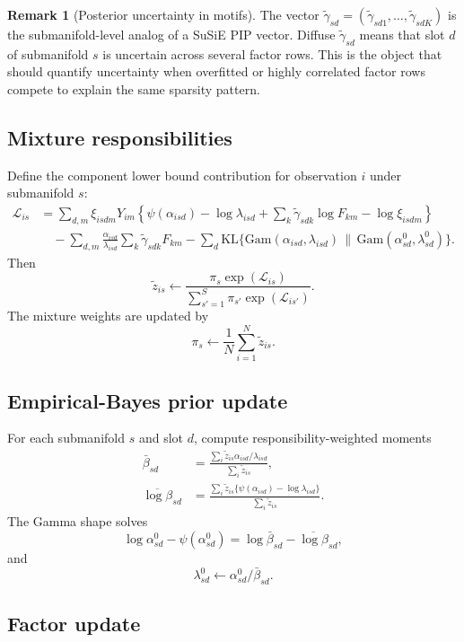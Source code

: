 \documentclass[11pt]{article}
\newcommand{\Gam}{\mathrm{Gam}}
\newcommand{\KL}{\mathrm{KL}}
\newcommand{\tg}{\widetilde{\gamma}}
\newcommand{\tz}{\widetilde{z}}
\theoremstyle{definition}
\newtheorem{remark}{Remark}
\begin{document}
\begin{remark}[Posterior uncertainty in motifs]
The vector $\tg_{sd}=(\tg_{sd1},\ldots,\tg_{sdK})$ is the submanifold-level
analog of a SuSiE PIP vector. Diffuse $\tg_{sd}$ means that slot $d$ of
submanifold $s$ is uncertain across several factor rows. This is the object that
should quantify uncertainty when overfitted or highly correlated factor rows
compete to explain the same sparsity pattern.
\end{remark}

\subsection{Mixture responsibilities}

Define the component lower bound contribution for observation $i$ under
submanifold $s$:
\begin{align}
  \mathcal{L}_{is}
  &=
  \sum_{d,m}
  \xi_{isdm}Y_{im}
  \left\{
    \psi(\alpha_{isd})-\log\lambda_{isd}
    +
    \sum_k\tg_{sdk}\log F_{km}
    -
    \log \xi_{isdm}
  \right\} \nonumber \\
  &\quad
  -
  \sum_{d,m}
  \frac{\alpha_{isd}}{\lambda_{isd}}
  \sum_k\tg_{sdk}F_{km}
  -
  \sum_d
  \KL\{\Gam(\alpha_{isd},\lambda_{isd})
        \,\|\,\Gam(\alpha^0_{sd},\lambda^0_{sd})\}.
\end{align}
Then
\[
  \tz_{is}
  \leftarrow
  \frac{\pi_s\exp(\mathcal{L}_{is})}
       {\sum_{s'=1}^{S}\pi_{s'}\exp(\mathcal{L}_{is'})}.
\]
The mixture weights are updated by
\[
  \pi_s \leftarrow \frac{1}{N}\sum_{i=1}^{N}\tz_{is}.
\]

\subsection{Empirical-Bayes prior update}

For each submanifold $s$ and slot $d$, compute responsibility-weighted moments
\begin{align}
  \bar{\beta}_{sd}
  &=
  \frac{\sum_i \tz_{is}\alpha_{isd}/\lambda_{isd}}
       {\sum_i \tz_{is}}, \\
  \overline{\log\beta}_{sd}
  &=
  \frac{\sum_i \tz_{is}\{\psi(\alpha_{isd})-\log\lambda_{isd}\}}
       {\sum_i \tz_{is}}.
\end{align}
The Gamma shape solves
\[
  \log\alpha^0_{sd}-\psi(\alpha^0_{sd})
  =
  \log\bar{\beta}_{sd}-\overline{\log\beta}_{sd},
\]
and
\[
  \lambda^0_{sd}\leftarrow \alpha^0_{sd}/\bar{\beta}_{sd}.
\]

\subsection{Factor update}
\end{document}
